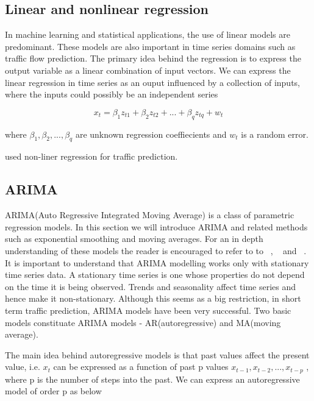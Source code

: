 \subsection{Linear and nonlinear regression}
In machine learning and statistical applications, the use of linear models are predominant. These
models are also important in time series domains such as traffic flow prediction. The primary
idea behind the regression is to express the output variable as a linear combination of input
vectors. We can express the linear regression in time series as an ouput influenced by a
collection of inputs, where the inputs could possibly be an independent series

        \begin{equation}
            x_{t} = \beta_{1}z_{t1} + \beta_{2}z_{t2} + ... + \beta_{q}z_{tq} + w_{t}
        \end{equation}

where $ \beta_{1}, \beta_{2},...,\beta_{q} $ are unknown regression coeffiecients and $w_{t}$ is
a random error.

\citet{hogberg1976estimation} used non-liner regression for traffic prediction.

\subsection{ARIMA}

ARIMA(Auto Regressive Integrated Moving Average) is a class of parametric regression models. In
this section we will introduce ARIMA and related methods such as exponential smoothing and moving
averages. For an in depth understanding of these models the reader is encouraged to refer to to
~\citet{tong1990non}, ~\citet{brockwell2006introduction} and ~\citet{box2015time}. It is
important to understand that ARIMA modelling works only with stationary time series data. A
stationary time series is one whose properties do not depend on the time it is being observed.
Trends and seasonality affect time series and hence make it non-stationary. Although this seems as a
big restriction, in short term traffic prediction, ARIMA models have been very successful. Two
basic models constituate ARIMA models - AR(autoregressive) and MA(moving average).

The main idea behind autoregressive models is that past values affect the present value, i.e.
$x_{t}$ can be expressed as a function of past p values $ x_{t-1}, x_{t-2},...,x_{t-p} $ , where
p is the number of steps into the past. We can express an autoregressive model of order p as below

